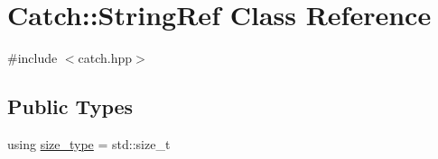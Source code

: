 \hypertarget{class_catch_1_1_string_ref}{}\section{Catch\+::String\+Ref Class Reference}
\label{class_catch_1_1_string_ref}


{\ttfamily \#include $<$catch.\+hpp$>$}

\subsection*{Public Types}
\begin{DoxyCompactItemize}
\item 
using \mbox{\hyperlink{class_catch_1_1_string_ref_a06b4db8fc82b197004291cf370b2ba7c}{size\+\_\+type}} = std\+::size\+\_\+t
\end{DoxyCompactItemize}
